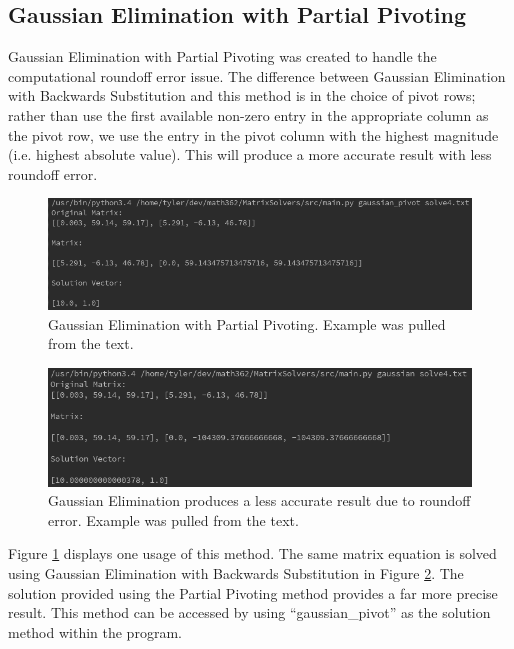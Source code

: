 \documentclass[12pt]{article}
\begin{document}
\subsection{Gaussian Elimination with Partial Pivoting}
Gaussian Elimination with Partial Pivoting was created to handle the 
computational roundoff error issue\cite{numerical}. The difference between Gaussian Elimination
with Backwards Substitution and this method is in the choice of pivot rows; 
rather than use the first available non-zero entry in the appropriate column
 as the pivot row, we use the entry in the pivot column with the highest magnitude (i.e. highest absolute value)\cite{numerical}. 
 This will produce a more accurate result with less roundoff error\cite{numerical}. 

\begin{figure}[H]
\begin{center}
\includegraphics[scale=.5]{pivot.png}
\caption{Gaussian Elimination with Partial Pivoting. Example was pulled from the text\cite{numerical}.}
\label{pivot}
\end{center}
\end{figure}

\begin{figure}[H]
\begin{center}
\includegraphics[scale=.5]{badgaussian.png}
\caption{Gaussian Elimination produces a less accurate result due to roundoff error. Example was pulled from the text\cite{numerical}.}
\label{badgaussian}
\end{center}
\end{figure}

Figure \ref{pivot} displays one usage of this method. The same matrix equation is solved
using Gaussian Elimination with Backwards Substitution in Figure \ref{badgaussian}. 
The solution provided using the Partial Pivoting method provides a far more 
precise result. This method can be accessed by using ``gaussian\_pivot'' as the 
solution method within the program.
\end{document}
